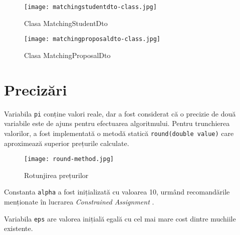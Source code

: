 \begin{figure}
\centering
	\begin{minipage}{0.5\textwidth}
		\centering
		\texttt{[image: matchingstudentdto-class.jpg]}
		\caption{Clasa MatchingStudentDto}
	\end{minipage}%
	\begin{minipage}{0.5\textwidth}
		\centering
		\texttt{[image: matchingproposaldto-class.jpg]}
		\caption{Clasa MatchingProposalDto}
	\end{minipage}
\end{figure}

\section{Precizări}

Variabila \texttt{pi} conține valori reale, dar a fost considerat că o precizie de două variabile este de ajuns pentru efectuarea algoritmului. Pentru trunchierea valorilor, a fost implementată o metodă statică \texttt{round(double value)} care aproximează superior prețurile calculate.

\begin{figure}[H]
	\centering
	\texttt{[image: round-method.jpg]}
	\caption{Rotunjirea prețurilor}
\end{figure}

Constanta \texttt{alpha} a fost inițializată cu valoarea 10, urmând recomandările menționate în lucrarea \textit{Constrained Assignment} \cite[p.~46]{assignment}.

Variabila \texttt{eps} are valorea inițială egală cu cel mai mare cost dintre muchiile existente.
